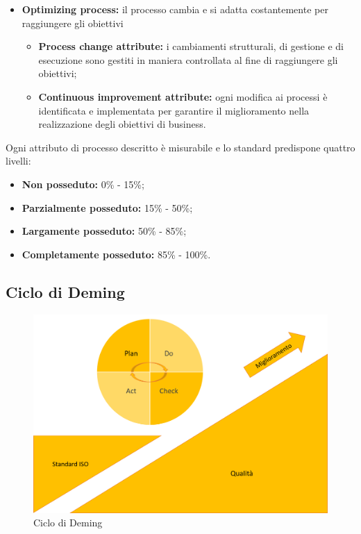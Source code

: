 \begin{itemize}
	\item \textbf{Optimizing process:} il processo cambia e si adatta costantemente per raggiungere gli obiettivi
	\begin{itemize}
		\item \textbf{Process change attribute:} i cambiamenti strutturali, di gestione e di esecuzione sono gestiti in maniera controllata al fine di raggiungere gli obiettivi;
		\item \textbf{Continuous improvement attribute:} ogni modifica ai 
		processi è identificata e implementata per garantire il miglioramento 
		nella realizzazione degli obiettivi di business.
	\end{itemize}
		
\end{itemize}

Ogni attributo di processo descritto è misurabile e lo standard predispone quattro livelli:

\begin{itemize}
	\item \textbf{Non posseduto:} 0\% - 15\%;
	\item \textbf{Parzialmente posseduto:} 15\% - 50\%;
	\item \textbf{Largamente posseduto:} 50\% - 85\%;
	\item \textbf{Completamente posseduto:} 85\% - 100\%.
\end{itemize}

\subsection{Ciclo di Deming}

\begin{figure}[H]
	\centering
	\includegraphics[width= 11.5cm]{immagini/pdca.png}
	\caption{Ciclo di Deming}
\end{figure}

